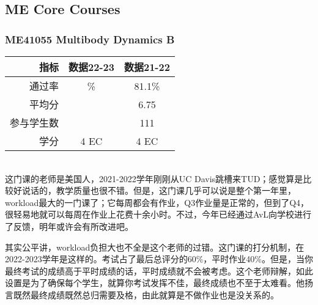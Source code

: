 \subsection{ME Core Courses}
\subsubsection{ME41055 Multibody Dynamics B}
\begin{minipage}{0.45\textwidth}
\centering
{}
\end{minipage}%
\begin{minipage}{0.45\textwidth}
\raggedleft
\begin{tabular}{r|c|c}
\textbf{指标} & \textbf{数据22-23} & \textbf{数据21-22}\\ \hline
通过率 & \% & 81.1\%\\ 
平均分 &   & 6.75\\ 
参与学生数 &  & 111\\
学分 & 4 EC & 4 EC\\
\end{tabular}
\end{minipage}\\

这门课的老师是美国人，2021-2022学年刚刚从UC Davis跳槽来TUD；感觉算是比较好说话的，教学质量也很不错。但是，这门课几乎可以说是整个第一年里，workload最大的一门课了；它每周都会有作业，Q3作业量是正常的，但到了Q4，很轻易地就可以每周在作业上花费十余小时。不过，今年已经通过AvL向学校进行了反馈，明年或许会有所改进吧。

其实公平讲，workload负担大也不全是这个老师的过错。这门课的打分机制，在2022-2023学年是这样的。考试占了最后总评分的60\%，平时作业40\%。但是，当你最终考试的成绩高于平时成绩的话，平时成绩就不会被考虑。这个老师辩解，如此设置是为了确保每个学生，就算你考试发挥不佳，最终成绩也不至于太难看。他扬言既然最终成绩既然总归需要及格，由此就算是不做作业也是没关系的。

